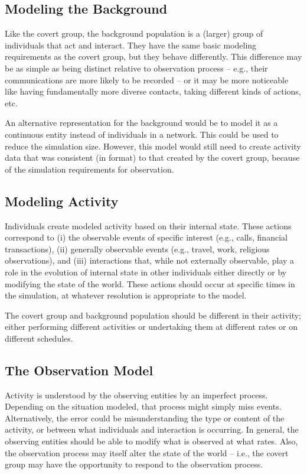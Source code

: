 \documentclass{article}
\begin{document}
\subsection*{Modeling the Background}
Like the covert group, the background population is a (larger) group of individuals that act and interact.  They have the same basic modeling requirements as the covert group, but they behave differently.  This difference may be as simple as being distinct relative to observation process -- e.g., their communications are more likely to be recorded -- or it may be more noticeable like having fundamentally more diverse contacts, taking different kinds of actions, etc.

An alternative representation for the background would be to model it as a continuous entity instead of individuals in a network.  This could be used to reduce the simulation size.  However, this model would still need to create activity data that was consistent (in format) to that created by the covert group, because of the simulation requirements for observation.

\subsection*{Modeling Activity}
Individuals create modeled activity based on their internal state.  These actions correspond to (i) the observable events of specific interest (e.g., calls, financial transactions), (ii) generally observable events (e.g., travel, work, religious observations), and (iii) interactions that, while not externally observable, play a role in the evolution of internal state in other individuals either directly or by modifying the state of the world.  These actions should occur at specific times in the simulation, at whatever resolution is appropriate to the model.

The covert group and background population should be different in their activity; either performing different activities or undertaking them at different rates or on different schedules.

\subsection*{The Observation Model}
Activity is understood by the observing entities by an imperfect process.  Depending on the situation modeled, that process might simply miss events.  Alternatively, the error could be misunderstanding the type or content of the activity, or between what individuals and interaction is occurring.  In general, the observing entities should be able to modify what is observed at what rates.  Also, the observation process may itself alter the state of the world -- i.e., the covert group may have the opportunity to respond to the observation process.
\end{document}
